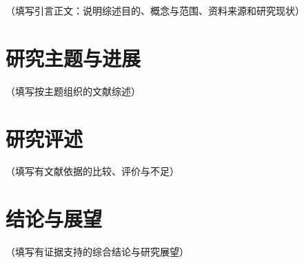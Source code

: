 （填写引言正文：说明综述目的、概念与范围、资料来源和研究现状）

\chapter{研究主题与进展}
（填写按主题组织的文献综述）

\chapter{研究评述}
（填写有文献依据的比较、评价与不足）

\chapter{结论与展望}
（填写有证据支持的综合结论与研究展望）
